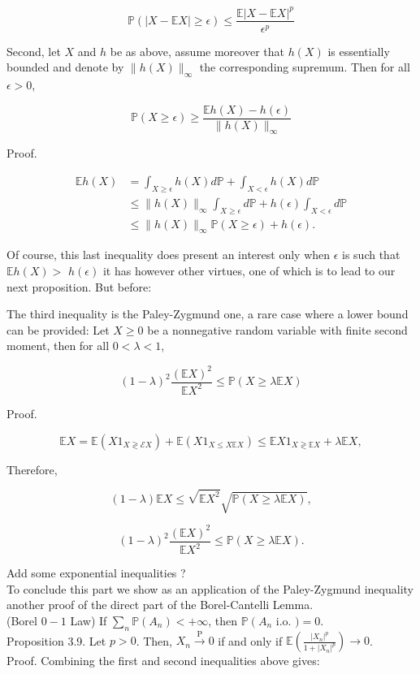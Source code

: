 \documentclass{amsbook}
\theoremstyle{plain}%
\theoremstyle{definition}
\theoremstyle{remark}
\begin{document}
    $$
    \mathbb{P}(|X-\mathbb{E} X| \geq \epsilon) \leq \frac{\mathbb{E}|X-\mathbb{E} X|^{p}}{\epsilon^{p}}
    $$

    Second, let $X$ and $h$ be as above, assume moreover that $h(X)$ is essentially bounded and denote by $\|h(X)\|_{\infty}$ the corresponding supremum. Then for all $\epsilon>0$,

    $$
    \mathbb{P}(X \geq \epsilon) \geq \frac{\mathbb{E} h(X)-h(\epsilon)}{\|h(X)\|_{\infty}}
    $$

    Proof.

    $$
    \begin{aligned}
      \mathbb{E} h(X) & =\int_{X \geq \epsilon} h(X) d \mathbb{P}+\int_{X<\epsilon} h(X) d \mathbb{P}                        \\
      & \leq\|h(X)\|_{\infty} \int_{X \geq \epsilon} d \mathbb{P}+h(\epsilon) \int_{X<\epsilon} d \mathbb{P} \\
      & \leq\|h(X)\|_{\infty} \mathbb{P}(X \geq \epsilon)+h(\epsilon) .
    \end{aligned}
    $$

    Of course, this last inequality does present an interest only when $\epsilon$ is such that $\mathbb{E} h(X)>$ $h(\epsilon)$ it has however other virtues, one of which is to lead to our next proposition. But before:

    The third inequality is the Paley-Zygmund one, a rare case where a lower bound can be provided: Let $X \geq 0$ be a nonnegative random variable with finite second moment, then for all $0<\lambda<1$,

    $$
    (1-\lambda)^{2} \frac{(\mathbb{E} X)^{2}}{\mathbb{E} X^{2}} \leq \mathbb{P}(X \geq \lambda \mathbb{E} X)
    $$

    Proof.

    $$
    \mathbb{E} X=\mathbb{E}\left(X 1_{X \gtrless \mathcal{E} X}\right)+\mathbb{E}\left(X 1_{X \leq X \mathbb{E} X}\right) \leq \mathbb{E} X 1_{X \gtrless \mathbb{E} X}+\lambda \mathbb{E} X,
    $$

    Therefore,

    $$
    (1-\lambda) \mathbb{E} X \leq \sqrt{\mathbb{E} X^{2}} \sqrt{\mathbb{P}(X \geq \lambda \mathbb{E} X)},
    $$

    $$
    (1-\lambda)^{2} \frac{(\mathbb{E} X)^{2}}{\mathbb{E} X^{2}} \leq \mathbb{P}(X \geq \lambda \mathbb{E} X) .
    $$

    Add some exponential inequalities ?\\
    To conclude this part we show as an application of the Paley-Zygmund inequality another proof of the direct part of the Borel-Cantelli Lemma.\\
    (Borel $0-1$ Law) If $\sum_{n} \mathbb{P}\left(A_{n}\right)<+\infty$, then $\mathbb{P}\left(A_{n}\right.$ i.o. $)=0$.\\
    Proposition 3.9. Let $p>0$. Then, $X_{n} \xrightarrow{\mathrm{P}} 0$ if and only if $\mathbb{E}\left(\frac{\left|X_{n}\right|^{p}}{1+\left|X_{n}\right|^{p}}\right) \rightarrow 0$.\\
    Proof. Combining the first and second inequalities above gives:
\end{document}
